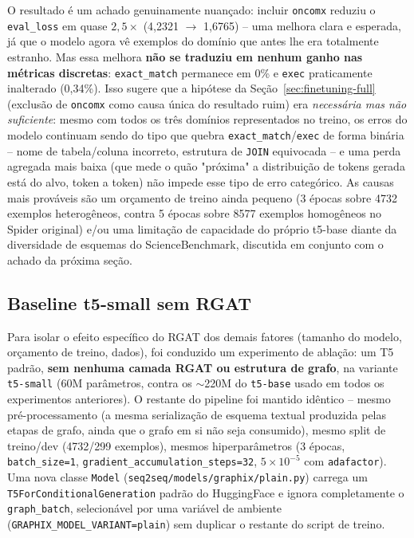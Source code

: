 O resultado é um achado genuinamente nuançado: incluir \texttt{oncomx}
reduziu o \texttt{eval\_loss} em quase $2{,}5\times$ (4,2321 $\to$ 1,6765) --
uma melhora clara e esperada, já que o modelo agora vê exemplos do domínio
que antes lhe era totalmente estranho. Mas essa melhora \textbf{não se
traduziu em nenhum ganho nas métricas discretas}: \texttt{exact\_match}
permanece em 0\% e \texttt{exec} praticamente inalterado (0,34\%). Isso
sugere que a hipótese da Seção~\ref{sec:finetuning-full} (exclusão de
\texttt{oncomx} como causa única do resultado ruim) era \emph{necessária
mas não suficiente}: mesmo com todos os três domínios representados no
treino, os erros do modelo continuam sendo do tipo que quebra
\texttt{exact\_match}/\texttt{exec} de forma binária -- nome de
tabela/coluna incorreto, estrutura de \texttt{JOIN} equivocada -- e uma
perda agregada mais baixa (que mede o quão "próxima" a distribuição de
tokens gerada está do alvo, token a token) não impede esse tipo de erro
categórico. As causas mais prováveis são um orçamento de treino ainda
pequeno (3 épocas sobre 4732 exemplos heterogêneos, contra 5 épocas sobre
8577 exemplos homogêneos no Spider original) e/ou uma limitação de
capacidade do próprio t5-base diante da diversidade de esquemas do
ScienceBenchmark, discutida em conjunto com o achado da próxima seção.

\subsection{Baseline t5-small sem RGAT}
\label{sec:t5small-baseline}

Para isolar o efeito específico do RGAT dos demais fatores (tamanho do
modelo, orçamento de treino, dados), foi conduzido um experimento de
ablação: um T5 padrão, \textbf{sem nenhuma camada RGAT ou estrutura de
grafo}, na variante \texttt{t5-small} (60M parâmetros, contra os $\sim$220M
do \texttt{t5-base} usado em todos os experimentos anteriores). O restante
do pipeline foi mantido idêntico -- mesmo pré-processamento (a mesma
serialização de esquema textual produzida pelas etapas de grafo, ainda que
o grafo em si não seja consumido), mesmo split de treino/dev (4732/299
exemplos), mesmos hiperparâmetros (3 épocas, \texttt{batch\_size=1},
\texttt{gradient\_accumulation\_steps=32}, $5\times10^{-5}$ com
\texttt{adafactor}). Uma nova classe \texttt{Model}
(\texttt{seq2seq/models/graphix/plain.py}) carrega um
\texttt{T5ForConditionalGeneration} padrão do HuggingFace e ignora
completamente o \texttt{graph\_batch}, selecionável por uma variável de
ambiente (\texttt{GRAPHIX\_MODEL\_VARIANT=plain}) sem duplicar o restante
do script de treino.

